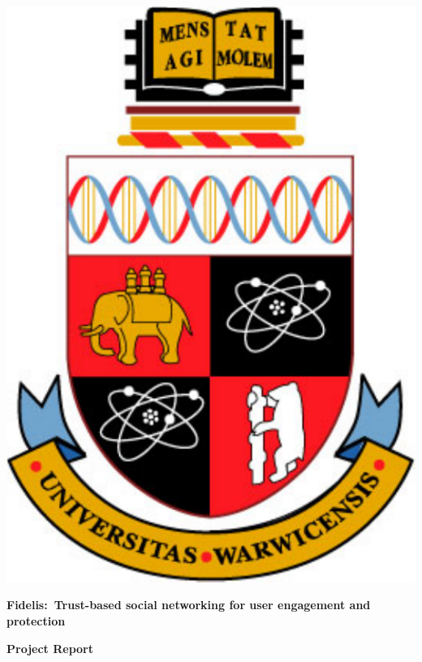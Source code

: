 \thispagestyle{empty}

\begin{spacing}{2}
	\begin{center}
		\includegraphics[scale = 0.4]{Images/Preamble/CWarwickCrest.pdf}
	\end{center}
	\vspace{5mm}
	
	\begin{center}
		\textbf{\large Fidelis:~Trust-based social networking for user engagement and protection}
	\end{center}
	\vspace{5mm}
	
	\begin{center}
		\textbf{\large Project Report}
	\end{center}
	

\end{spacing}
